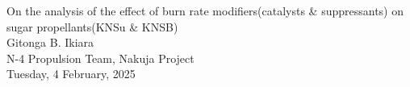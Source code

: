 \documentclass[12pt,letterpaper]{article}
\begin{document}
	\begin{center}
		\huge{On the analysis of the effect of burn rate modifiers(catalysts \& suppressants) on sugar propellants(KNSu \& KNSB)} \\
		\Large{Gitonga B. Ikiara} \\
		\large{N-4 Propulsion Team, Nakuja Project} \\
		\normalsize{Tuesday, 4 February, 2025} \\
	\end{center}

	
	
	
	
	\appendix
	
	
\end{document}
